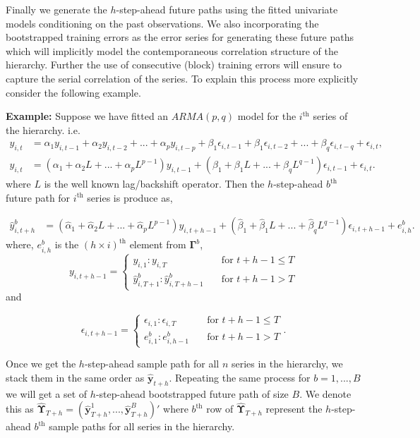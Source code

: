 \documentclass[12pt]{article}
\theoremstyle{definition}
\begin{document}
Finally we generate the $h$-step-ahead future paths using the fitted univariate models conditioning on the past observations. We also incorporating the bootstrapped training errors as the error series for generating these future paths which will implicitly model the contemporaneous correlation structure of the hierarchy. Further the use of consecutive (block) training errors will ensure to capture the serial correlation of the series. To explain this process more explicitly consider the following example. 

\noindent
\textbf{Example:}
Suppose we have fitted an $ARMA(p,q)$ model for the $i^\text{th}$ series of the hierarchy. i.e.
\begin{align*}
y_{i,t} &= \alpha_1y_{i,t-1} + \alpha_2y_{i,t-2}+...+\alpha_py_{i,t-p} + \beta_1\epsilon_{i,t-1} + \beta_1\epsilon_{i,t-2}+...+\beta_q\epsilon_{i,t-q} + \epsilon_{i,t},\\
y_{i,t} &= (\alpha_1 + \alpha_2L+...+\alpha_pL^{p-1})y_{i,t-1} + (\beta_1 + \beta_1L+...+\beta_qL^{q-1})\epsilon_{i,t-1} + \epsilon_{i,t}.
\end{align*}
where $L$ is the well known lag/backshift operator. Then the $h$-step-ahead $b^\text{th}$ future path for $i^\text{th}$ series is produce as,

\begin{align*}
\hat{y}^b_{i,t+h} &= (\hat{\alpha}_1 + \hat{\alpha}_2L +...+ \hat{\alpha}_pL^{p-1})y_{i,t+h-1} + (\hat{\beta}_1 + \hat{\beta}_1L+...+\hat{\beta}_qL^{q-1})\epsilon_{i,t+h-1} + e^b_{i,h}.
\end{align*}
where, $e^b_{i,h}$ is the $(h\times i)^\text{th}$ element from $\bm{\Gamma}^b$,
\begin{equation*}
y_{i,t+h-1} =
\begin{cases}
y_{i,1}:y_{i,T}       & \quad \text{for } t+h-1 \le T\\
\hat{y}^b_{i,T+1}:\hat{y}^b_{i,T+h-1}  & \quad \text{for } t+h-1 > T
\end{cases}
\end{equation*}
and 

\begin{equation*}
\epsilon_{i,t+h-1} =
\begin{cases}
\epsilon_{i,1}:\epsilon_{i,T}       & \quad \text{for } t+h-1 \le T\\
e^b_{i,1}:e^b_{i,h-1}  & \quad \text{for } t+h-1 > T
\end{cases}.
\end{equation*}

Once we get the $h$-step-ahead sample path for all $n$ series in the hierarchy, we stack them in the same order as $\hat{\bm{y}}_{t+h}$. Repeating the same process for $b = 1,...,B$ we will get a set of $h$-step-ahead bootstrapped future path of size $B$. We denote this as $\hat{\bm{\Upsilon}}_{T+h} = (\hat{\bm{y}}^1_{T+h},...,\hat{\bm{y}}^B_{T+h})'$ where $b^\text{th}$ row of $\hat{\bm{\Upsilon}}_{T+h}$ represent the $h$-step-ahead $b^\text{th}$ sample paths for all series in the hierarchy. 
\end{document}
